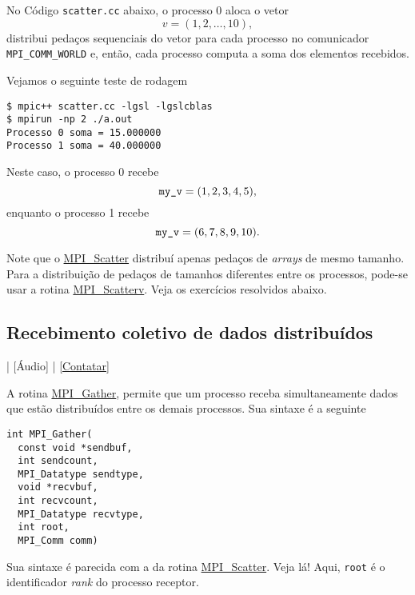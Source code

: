 \begin{ex}
  No Código \verb+scatter.cc+ abaixo, o processo 0 aloca o vetor
  \begin{equation}
    v = (1, 2, \dotsc, 10),
  \end{equation}
  distribui pedaços sequenciais do vetor para cada processo no comunicador \verb+MPI_COMM_WORLD+ e, então, cada processo computa a soma dos elementos recebidos.



  Vejamos o seguinte teste de rodagem
\begin{verbatim}
$ mpic++ scatter.cc -lgsl -lgslcblas
$ mpirun -np 2 ./a.out                                           
Processo 0 soma = 15.000000
Processo 1 soma = 40.000000
\end{verbatim}
  Neste caso, o processo 0 recebe
  \begin{equation}
    \verb+my_v+ = (1, 2, 3, 4, 5),
  \end{equation}
  enquanto o processo 1 recebe
  \begin{equation}
    \verb+my_v+ = (6, 7, 8, 9, 10).
  \end{equation}
\end{ex}

\begin{obs}
  Note que o \href{https://www.open-mpi.org/doc/current/man3/MPI\_Scatter.3.php}{MPI\_Scatter} distribuí apenas pedaços de {\it arrays} de mesmo tamanho. Para a distribuição de pedaços de tamanhos diferentes entre os processos, pode-se usar a rotina \href{https://www.open-mpi.org/doc/current/man3/MPI\_Scatterv.3.php}{MPI\_Scatterv}. Veja os exercícios resolvidos abaixo.
\end{obs}

\subsection {Recebimento coletivo de dados distribuídos}

\begin{flushright}
  [Vídeo] | [Áudio] | \href{https://phkonzen.github.io/notas/contato.html}{[Contatar]}
\end{flushright}

A rotina \href{https://www.open-mpi.org/doc/current/man3/MPI\_Gather.3.php}{MPI\_Gather}, permite que um processo receba simultaneamente dados que estão distribuídos entre os demais processos. Sua sintaxe é a seguinte
\begin{verbatim}
int MPI_Gather(
  const void *sendbuf, 
  int sendcount, 
  MPI_Datatype sendtype,
  void *recvbuf, 
  int recvcount, 
  MPI_Datatype recvtype, 
  int root,
  MPI_Comm comm)
\end{verbatim}
Sua sintaxe é parecida com a da rotina \href{https://www.open-mpi.org/doc/current/man3/MPI\_Scatter.3.php}{MPI\_Scatter}. Veja lá! Aqui, \verb+root+ é o identificador {\it rank} do processo receptor.

